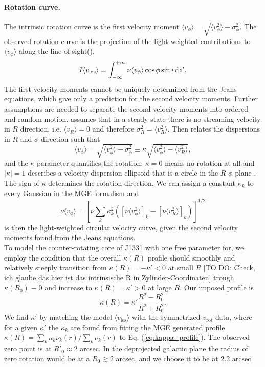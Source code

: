 \paragraph{Rotation curve.} The intrinsic rotation curve is the first velocity moment $\langle v_\phi\rangle = \sqrt{\langle v_\phi^2 \rangle - \sigma_\phi^2}$. The observed rotation curve is the projection of the light-weighted contributions to $\langle v_\phi\rangle$ along the line-of-sight(\cite{Cap08}),
\begin{equation*}
I \langle v_\text{los}\rangle = \int_{-\infty}^{+\infty} \nu \langle v_\phi\rangle \cos \phi \sin i \mathop{}\!\mathrm{d} z'.
\end{equation*}
The first velocity moments cannot be uniquely determined from the Jeans equations, which give only a prediction for the second velocity moments. Further assumptions are needed to separate the second velocity moments into ordered and random motion. \citet{Cap08} assumes that in a steady state there is no streaming velocity in $R$ direction, i.e. $\langle v_R \rangle = 0$ and therefore $\sigma_R^2 = \langle v_R^2 \rangle$. Then \citet{Cap08} relates the dispersions in $R$ and $\phi$ direction such that
$$\langle v_\phi\rangle = \sqrt{\langle v_\phi^2 \rangle - \sigma_\phi^2} \equiv \kappa \sqrt{\langle v_\phi^2 \rangle - \langle v_R^2 \rangle},$$
and the $\kappa$ parameter quantifies the rotation: $\kappa = 0$ means no rotation at all and $|\kappa| = 1$ describes a velocity dispersion ellipsoid that is a circle in the $R$-$\phi$ plane \citep{Cap08}. The sign of $\kappa$ determines the rotation direction. We can assign a constant $\kappa_k$ to every Gaussian in the MGE formalism and
\begin{equation*}
\nu \langle v_\phi\rangle = \left[\nu \sum_{k} \kappa_k^2 \left( [\nu\langle v_\phi^2 \rangle]_k - [\nu\langle v_R^2 \rangle]_k\right) \right]^{1/2}
\end{equation*} 
is then the light-weighted circular velocity curve, given the second velocity moments found from the Jeans equations.
\\To model the counter-rotating core of J1331 with one free parameter for, we employ the condition that the overall $\kappa(R)$ profile should smoothly and relatively steeply transition from $\kappa(R) = -\kappa' < 0$ at small $R$ [TO DO: Check, ich glaube das hier ist das intrinsische R in Zylinder-Coordinaten] trough $\kappa(R_0) \equiv 0$ and increase to $\kappa(R) = \kappa' > 0$ at large $R$. Our imposed profile is
\begin{equation}
\kappa(R) = \kappa' \frac{R^2 - R_0^2}{R^2 + R_0^2}. \label{eq:kappa_profile}
\end{equation}
We find $\kappa'$ by matching the model $\langle v_\text{los} \rangle$ with the symmetrized $v_\text{rot}$ data, where for a given $\kappa'$ the $\kappa_k$ are found from fitting the MGE generated profile $\kappa(R) = \sum_k \kappa_k \nu_k(r)/\sum_k \nu_k(r)$ to Eq. (\ref{eq:kappa_profile}). The observed zero point is at $R'_0\approx 2$ arcsec. In the deprojected galactic plane the radius of zero rotation would be at a $R_0 \gtrsim 2$ arcsec, and we choose it to be at 2.2 arcsec.